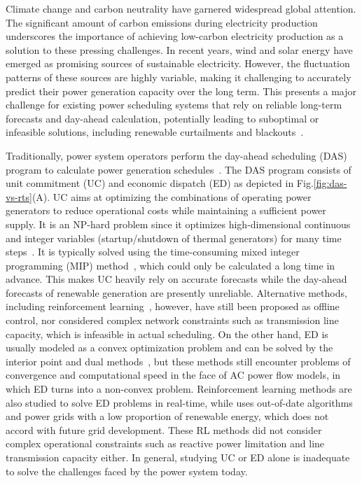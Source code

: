 Climate change and carbon neutrality have garnered widespread global attention. The significant amount of carbon emissions during electricity production underscores the importance of achieving low-carbon electricity production as a solution to these pressing challenges.
In recent years, wind and solar energy have emerged as promising sources of sustainable electricity. However, the fluctuation patterns of these sources are highly variable, making it challenging to accurately predict their power generation capacity over the long term.
This presents a major challenge for existing power scheduling systems that rely on reliable long-term forecasts and day-ahead calculation, potentially leading to suboptimal or infeasible solutions, including renewable curtailments and blackouts~\cite{enwiki:1103904998,bialek2020does}.

Traditionally, power system operators perform the day-ahead scheduling (DAS) program to calculate power generation schedules~\cite{wood2013power}. 
The DAS program consists of unit commitment (UC) and economic dispatch (ED) as depicted in Fig.\ref{fig:das-vs-rts}(A). 
UC aims at optimizing the combinations of operating power generators to reduce operational costs while maintaining a sufficient power supply. It is an NP-hard problem since it optimizes high-dimensional continuous and integer variables (startup/shutdown of thermal generators) for many time steps~\cite{bendotti2019complexity}.
It is typically solved using the time-consuming mixed integer programming (MIP) method~\cite{bhardwaj2012unit,jabr2012tight}, which could only be calculated a long time in advance. This makes UC heavily rely on accurate forecasts while the day-ahead forecasts of renewable generation are presently unreliable. 
Alternative methods, including reinforcement learning~\cite{de2021applying,de2022reinforcement,ajagekar2022deep}, however, have still been proposed as offline control, nor considered complex network constraints such as transmission line capacity, which is infeasible in actual scheduling. 
On the other hand, ED is usually modeled as a convex optimization problem and can be solved by the interior point and dual methods~\cite{jabr2002primal, olofsson1995linear,sun1984optimal}, but these methods still encounter problems of convergence and computational speed in the face of AC power flow models, in which ED turns into a non-convex problem.
Reinforcement learning methods are also studied to solve ED problems in real-time, while \cite{zhou2020data,zhou2021deep,woo2020real} uses out-of-date algorithms and power grids with a low proportion of renewable energy, which does not accord with future grid development. These RL methods did not consider complex operational constraints such as reactive power limitation and line transmission capacity either.
In general, studying UC or ED alone is inadequate to solve the challenges faced by the power system today.


